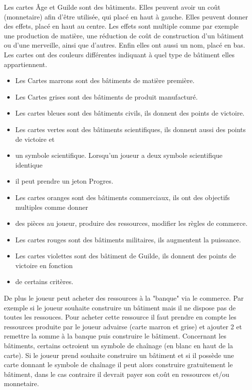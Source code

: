 \documentclass[a4paper, 12pt, french]{article}
\begin{document}
	Les cartes Âge et Guilde sont des bâtiments. Elles peuvent avoir un coût (monnetaire) afin d'être
	utilisée, qui placé en haut à gauche. Elles peuvent donner des effets, placé en haut au centre.
	Les effets sont multiple comme par exemple une production de matière, une réduction de coût de construction
	d'un bâtiment ou d'une merveille, ainsi que d'autres. Enfin elles ont aussi un nom, placé en bas. Les cartes
	ont des couleurs différentes indiquant à quel type de bâtiment elles appartiennent.
	\begin{itemize}
		\item Les Cartes marrons sont des bâtiments de matière première.
		\item Les Cartes grises sont des bâtiments de produit manufacturé.
		\item Les cartes bleues sont des bâtiments civils, ils donnent des points de victoire.
		\item Les cartes vertes sont des bâtiments scientifiques, ils donnent aussi des points de victoire et
		\item un symbole scientifique. Lorsqu'un joueur a deux symbole scientifique identique
		\item il peut prendre un jeton Progres.
		\item Les cartes oranges sont des bâtiments commerciaux, ils ont des objectifs multiples comme donner
		\item des pièces au joueur, produire des ressources, modifier les règles de commerce.
		\item Les cartes rouges sont des bâtiments militaires, ils augmentent la puissance.
		\item Les cartes violettes sont des bâtiment de Guilde, ils donnent des points de victoire en fonction
		\item de certains critères.
	\end{itemize}

	De plus le joueur peut acheter des ressources à la "banque" via le commerce. Par exemple si le joueur souhaite
	construire un bâtiment mais il ne dispose pas de toutes les ressouces. Pour acheter cette ressource il faut prendre
	en compte les ressources produite par le joueur advairse (carte marron et grise) et ajouter 2 et remettre la somme
	à la banque puis construire le bâtiment. Concernant les bâtiments, certains octroient un symbole de chaînage
	(en blanc en haut de la carte). Si le joueur prend souhaite construire un bâtiment et si il possède une carte
	donnant le symbole de chaînage il peut alors construire gratuitement le bâtiment, dans le cas contraire
	il devrait payer son coût en ressources et/ou monnetaire.
\end{document}
